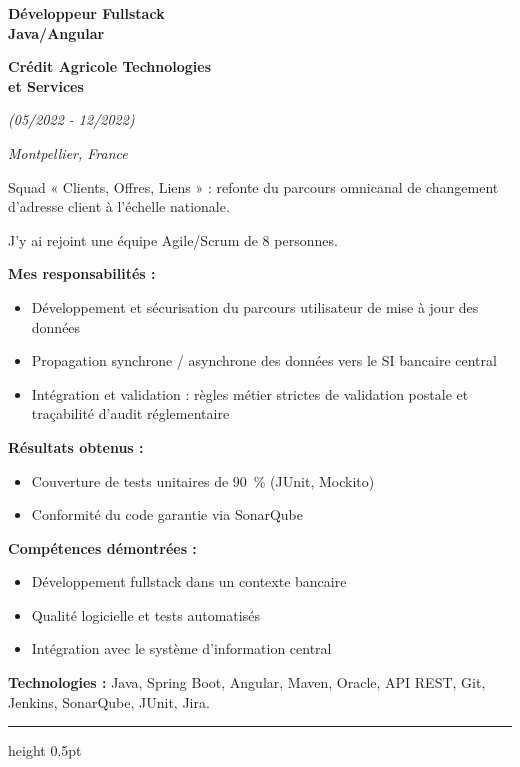 \documentclass[a4paper,10pt]{article}
\newcommand{\dcsub}[1]{%
  \par\vspace{2.1mm}%
  \noindent\textbf{#1}\par
  \vspace{0.4mm}%
}
\newcommand{\dctech}[1]{%
  \par\vspace{2.0mm}%
  \noindent\textbf{Technologies :} #1\par
}
\newlength{\dcleftw}\setlength{\dcleftw}{51.2mm}
\newlength{\dcgap}\setlength{\dcgap}{2.8mm}
\newcommand{\dcexperience}[2]{%
  \par\noindent
  \begin{minipage}[t]{\dcleftw}
    \raggedright #1
  \end{minipage}%
  \hspace{\dcgap}%
  \begin{minipage}[t]{\dimexpr\textwidth-\dcleftw-\dcgap\relax}
    \raggedright\color{dcbody}#2
  \end{minipage}%
  \par
}
\newcommand{\dcjob}[4]{%
  {\fontsize{11.2}{13.4}\selectfont\bfseries\color{dcnavy}#1}\par
  \vspace{0.7mm}%
  {\fontsize{10}{12}\selectfont\bfseries\color{dcnavy}#2}\par
  \vspace{0.9mm}%
  {\fontsize{8.2}{10}\selectfont\itshape\color{dcmuted}(#3)}\par
  \vspace{0.35mm}%
  {\fontsize{7.8}{9.5}\selectfont\itshape\color{dcgoldsoft}#4}\par
}
\newcommand{\dcrule}{%
  \par\vspace{4.2mm}%
  {\color{dcgold}\hrule height 0.5pt}\par
  \vspace{4.2mm}%
}
\begin{document}
\dcexperience{%
  \dcjob{Développeur Fullstack\\Java/Angular}%
        {Crédit Agricole Technologies\\et Services}%
        {05/2022 - 12/2022}%
        {Montpellier, France}
}{%
  Squad « Clients, Offres, Liens » : refonte du parcours omnicanal de changement
  d'adresse client à l'échelle nationale.

  \vspace{1.2mm}
  J'y ai rejoint une équipe Agile/Scrum de 8 personnes.

  \dcsub{Mes responsabilités :}
  \begin{itemize}
    \item Développement et sécurisation du parcours utilisateur de mise à jour des données
    \item Propagation synchrone / asynchrone des données vers le SI bancaire central
    \item Intégration et validation : règles métier strictes de validation postale et traçabilité
          d'audit réglementaire
  \end{itemize}

  \dcsub{Résultats obtenus :}
  \begin{itemize}
    \item Couverture de tests unitaires de 90~\% (JUnit, Mockito)
    \item Conformité du code garantie via SonarQube
  \end{itemize}

  \dcsub{Compétences démontrées :}
  \begin{itemize}
    \item Développement fullstack dans un contexte bancaire
    \item Qualité logicielle et tests automatisés
    \item Intégration avec le système d'information central
  \end{itemize}

  \dctech{Java, Spring Boot, Angular, Maven, Oracle, API REST, Git, Jenkins, SonarQube, JUnit, Jira.}
}

\dcrule
\end{document}

